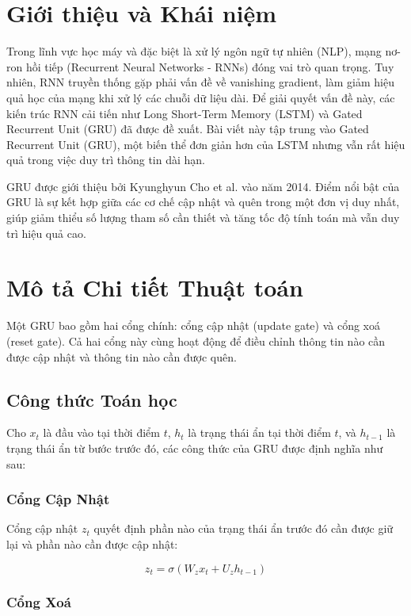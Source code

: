 \documentclass{article}
\begin{document}
\section{Giới thiệu và Khái niệm}

Trong lĩnh vực học máy và đặc biệt là xử lý ngôn ngữ tự nhiên (NLP), mạng nơ-ron hồi tiếp (Recurrent Neural Networks - RNNs) đóng vai trò quan trọng. Tuy nhiên, RNN truyền thống gặp phải vấn đề về vanishing gradient, làm giảm hiệu quả học của mạng khi xử lý các chuỗi dữ liệu dài. Để giải quyết vấn đề này, các kiến trúc RNN cải tiến như Long Short-Term Memory (LSTM) và Gated Recurrent Unit (GRU) đã được đề xuất. Bài viết này tập trung vào Gated Recurrent Unit (GRU), một biến thể đơn giản hơn của LSTM nhưng vẫn rất hiệu quả trong việc duy trì thông tin dài hạn.

GRU được giới thiệu bởi Kyunghyun Cho et al. vào năm 2014. Điểm nổi bật của GRU là sự kết hợp giữa các cơ chế cập nhật và quên trong một đơn vị duy nhất, giúp giảm thiểu số lượng tham số cần thiết và tăng tốc độ tính toán mà vẫn duy trì hiệu quả cao.

\section{Mô tả Chi tiết Thuật toán}

Một GRU bao gồm hai cổng chính: cổng cập nhật (update gate) và cổng xoá (reset gate). Cả hai cổng này cùng hoạt động để điều chỉnh thông tin nào cần được cập nhật và thông tin nào cần được quên. 

\subsection{Công thức Toán học}

Cho \( x_t \) là đầu vào tại thời điểm \( t \), \( h_t \) là trạng thái ẩn tại thời điểm \( t \), và \( h_{t-1} \) là trạng thái ẩn từ bước trước đó, các công thức của GRU được định nghĩa như sau:

\subsubsection{Cổng Cập Nhật}

Cổng cập nhật \( z_t \) quyết định phần nào của trạng thái ẩn trước đó cần được giữ lại và phần nào cần được cập nhật:

\[
z_t = \sigma(W_z x_t + U_z h_{t-1})
\]

\subsubsection{Cổng Xoá}
\end{document}
